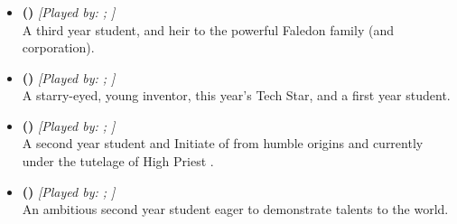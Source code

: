 \documentclass[blue]{GL2020}
\begin{document}
\subsubsection*{\pTech{}}
\begin{itemize}
	\item \textbf{\cHeir{\full} (\cHeir{\MYCharpronouns})} \textit{[Played by: \cHeir{\MYplayer}; \cHeir{\MYPlaypronouns}]}\\ A third year student, and heir to the powerful Faledon family (and corporation).

	\item \textbf{\cTechStar{\full} (\cTechStar{\MYCharpronouns})} \textit{[Played by: \cTechStar{\MYplayer}; \cTechStar{\MYPlaypronouns}]}\\ A starry-eyed, young inventor, this year's Tech Star, and a first year student.

	\item \textbf{\cScholarship{\full} (\cScholarship{\MYCharpronouns})} \textit{[Played by: \cScholarship{\MYplayer}; \cScholarship{\MYPlaypronouns}]}\\ A second year student and Initiate of \cTechGod{} from humble origins and currently under the tutelage of High Priest \cAntiChup{}.

	\item \textbf{\cAmbition{\full} (\cAmbition{\MYCharpronouns})} \textit{[Played by: \cAmbition{\MYplayer}; \cAmbition{\MYPlaypronouns}]}\\ An ambitious second year student  eager to demonstrate \cAmbition{\their} talents to the world.
	
\end{itemize}
\end{document}
